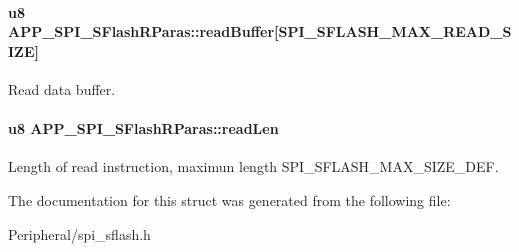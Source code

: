 \paragraph[{\texorpdfstring{read\+Buffer}{readBuffer}}]{\setlength{\rightskip}{0pt plus 5cm}u8 A\+P\+P\+\_\+\+S\+P\+I\+\_\+\+S\+Flash\+R\+Paras\+::read\+Buffer\mbox{[}{\bf S\+P\+I\+\_\+\+S\+F\+L\+A\+S\+H\+\_\+\+M\+A\+X\+\_\+\+R\+E\+A\+D\+\_\+\+S\+I\+ZE}\mbox{]}}\hypertarget{struct_a_p_p___s_p_i___s_flash_r_paras_aeceaeb193536f7f884aed96a7abf7a3e}{}\label{struct_a_p_p___s_p_i___s_flash_r_paras_aeceaeb193536f7f884aed96a7abf7a3e}
Read data buffer. 
\paragraph[{\texorpdfstring{read\+Len}{readLen}}]{\setlength{\rightskip}{0pt plus 5cm}u8 A\+P\+P\+\_\+\+S\+P\+I\+\_\+\+S\+Flash\+R\+Paras\+::read\+Len}\hypertarget{struct_a_p_p___s_p_i___s_flash_r_paras_a8923c378d042bdf8d029e504f89f5a7b}{}\label{struct_a_p_p___s_p_i___s_flash_r_paras_a8923c378d042bdf8d029e504f89f5a7b}
Length of read instruction, maximun length S\+P\+I\+\_\+\+S\+F\+L\+A\+S\+H\+\_\+\+M\+A\+X\+\_\+\+S\+I\+Z\+E\+\_\+\+D\+EF. 

The documentation for this struct was generated from the following file\+:\begin{DoxyCompactItemize}
\item 
Peripheral/spi\+\_\+sflash.\+h\end{DoxyCompactItemize}
